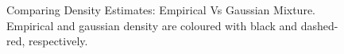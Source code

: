 \documentclass{article}\usepackage[]{graphicx}\usepackage[]{color}
\begin{document}
\begin{figure}[!htp]
    \caption{Comparing Density Estimates: Empirical Vs Gaussian Mixture. Empirical and gaussian density are coloured with black and dashed-red, respectively.}
    \label{fig:empVsgauss}
\end{figure}
\clearpage
\end{document}
